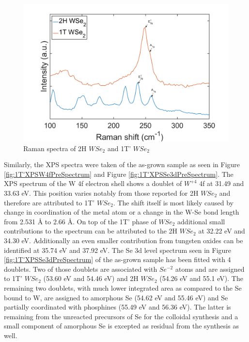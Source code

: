 \begin{figure}[!h]
	\begin{center}
		\includegraphics[scale=0.3]{1T'/RamanSpectraComparison.png}
		\caption{Raman spectra of 2H $WSe_2$ and 1T' $WSe_2$}
		\label{fig:1T'RamanSpectraComparison}
	\end{center}
\end{figure}

Similarly, the XPS spectra were taken of the as-grown sample as seen in Figure \ref{fig:1T'XPSW4fPreSpectrum} and Figure \ref{fig:1T'XPSSe3dPreSpectrum}. The XPS spectrum of the W 4f electron shell shows a doublet of $W^{+4}$ 4f at 31.49 and 33.63 eV. This position varies notably from those reported for 2H $WSe_2$ and therefore are attributed to 1T' $WSe_2$. The shift itself is most likely caused by change in coordination of the metal atom or a change in the W-Se bond length from 2.531 \r{A} to 2.66 \r{A}. On top of the 1T' phase of $WSe_2$ additional small contributions to the spectrum can be attributed to the 2H $WSe_2$ at 32.22 eV and 34.30 eV. Additionally an even smaller contribution from tungsten oxides can be identified at 35.74 eV and 37.92 eV. The Se 3d level spectrum seen in Figure \ref{fig:1T'XPSSe3dPreSpectrum} of the as-grown sample has been fitted with 4 doublets. Two of those doublets are associated with $Se^{-2}$ atoms and are assigned to 1T' $WSe_2$ (53.60 eV and 54.46 eV) and 2H $WSe_2$ (54.26 eV and 55.1 eV). The remaining two doublets, with much lower integrated area as compared to the Se bound to W, are assigned to amorphous Se (54.62 eV and 55.46 eV) and Se partially coordinated with phosphines (55.49 eV and 56.36 eV). The latter is remaining from the unreacted precursors of Se for the colloidal synthesis and a small component of amorphous Se is excepted as residual from the synthesis as well.

